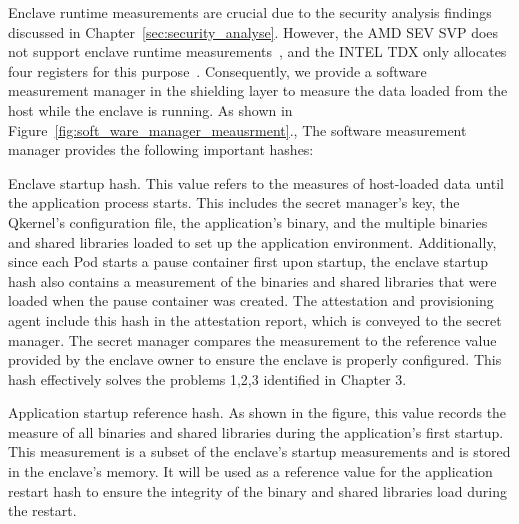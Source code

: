 Enclave runtime measurements are crucial due to the security analysis findings discussed in Chapter~\ref{sec:security_analyse}. However, the AMD SEV SVP does not support enclave runtime measurements~\cite*{snp_firmware}, and the INTEL TDX only allocates four registers for this purpose~\cite*{Intel_tdx_whitepaper}. Consequently, we provide a software measurement 
manager in the shielding layer to measure the data loaded from the host while the enclave is running. As shown in Figure~\ref{fig:soft_ware_manager_meausrment}., The software measurement manager provides the following important hashes:

Enclave startup hash. This value refers to the measures of host-loaded data until the application process starts. This includes the secret manager's key, the Qkernel's configuration file, the application's binary, and the multiple binaries and shared libraries loaded to set up the application environment. Additionally, since each Pod starts a pause container 
first upon startup, the enclave startup hash also contains a measurement of the binaries and shared libraries that were loaded when the pause container was created. The attestation and provisioning agent include this hash in the attestation report, which is conveyed to the secret manager. The secret manager compares the measurement to the reference value provided 
by the enclave owner to ensure the enclave is properly configured. This hash effectively solves the problems 1,2,3 identified in Chapter 3.

Application startup reference hash. As shown in the figure, this value records the measure of all binaries and shared libraries during the application's first startup. This measurement is a subset of the enclave's startup measurements and is stored in the enclave's memory. It will be used as a reference value for the application restart hash to ensure the 
integrity of the binary and shared libraries load during the restart. 

